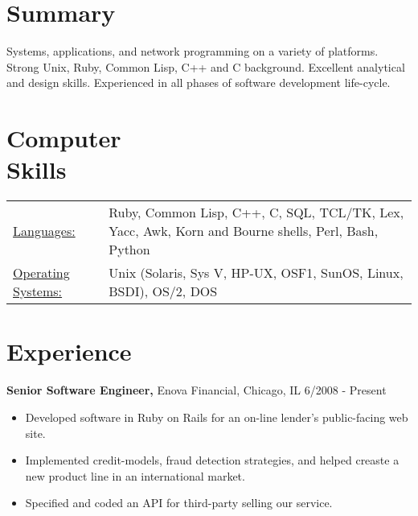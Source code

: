 \documentclass[margin]{res}
\begin{document}
 
 
 
\address{{\bf Home Address} \\ 2446 North Albany Avenue \\ Chicago, IL 60647-2602  \\
        (773) 627-2020 }
\address{{\bf Email Address} \\ craig.ludington@rimpoche.chi.il.us }

 
\begin{resume} 
 
\section{Summary} 
Systems, applications, and network programming on a variety of platforms.
Strong Unix, Ruby, Common Lisp, C++ and  C background.
Excellent analytical and design skills.
Experienced in all phases of software development life-cycle.

\section{Computer \\ Skills}
   \begin{tabular}{l p{3in}}
    \underline{Languages:} & Ruby, Common Lisp, C++, C, SQL, TCL/TK, Lex, Yacc, Awk, Korn and Bourne shells, Perl, Bash, Python \\
     \underline{Operating Systems:} & Unix (Solaris, Sys V, HP-UX, OSF1, SunOS, Linux, BSDI), OS/2, DOS
 \end{tabular}

\section{Experience}
 {\bf Senior Software Engineer,} Enova Financial, Chicago, IL \hfill 6/2008 - Present
\begin{itemize} \itemsep -2pt 
\item Developed software in Ruby on Rails for an on-line lender's public-facing web site. 
\item Implemented credit-models, fraud detection strategies, and helped creaste a new product line in an international market.
\item Specified and coded an API for third-party selling our service.
\end{itemize}



\end{resume}
\end{document}
